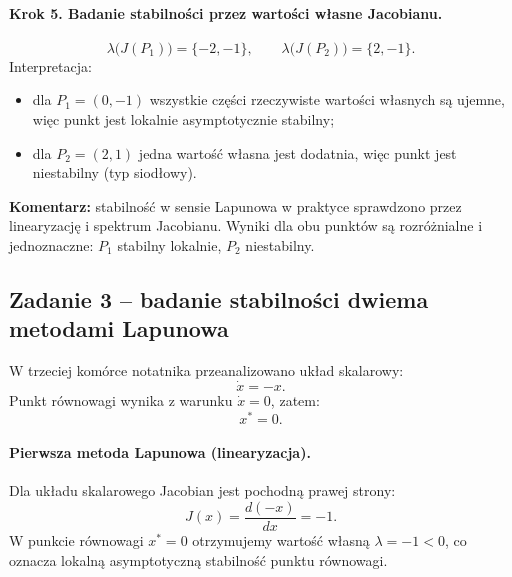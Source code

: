 \documentclass[12pt,a4paper]{article}
\begin{document}
\paragraph{Krok 5. Badanie stabilno\'sci przez warto\'sci w\l{}asne Jacobianu.}
\begin{equation}
    \lambda\big(J(P_1)\big)=\{-2,-1\},\qquad
    \lambda\big(J(P_2)\big)=\{2,-1\}.
\end{equation}
Interpretacja:
\begin{itemize}
    \item dla $P_1=(0,-1)$ wszystkie cz\k{e}\'sci rzeczywiste warto\'sci w\l{}asnych s\k{a} ujemne, wi\k{e}c punkt jest lokalnie asymptotycznie stabilny;
    \item dla $P_2=(2,1)$ jedna warto\'s\'c w\l{}asna jest dodatnia, wi\k{e}c punkt jest niestabilny (typ siod\l{}owy).
\end{itemize}

\textbf{Komentarz:} stabilno\'s\'c w sensie Lapunowa w praktyce sprawdzono przez linearyzacj\k{e} i spektrum Jacobianu. Wyniki dla obu punkt\'ow s\k{a} rozr\'o\.znialne i jednoznaczne: $P_1$ stabilny lokalnie, $P_2$ niestabilny.

\subsection{Zadanie 3 -- badanie stabilno\'sci dwiema metodami Lapunowa}
W trzeciej kom\'orce notatnika przeanalizowano uk\l{}ad skalarowy:
\begin{equation}
    \dot{x}=-x.
\end{equation}
Punkt r\'ownowagi wynika z warunku $\dot{x}=0$, zatem:
\begin{equation}
    x^\ast=0.
\end{equation}

\paragraph{Pierwsza metoda Lapunowa (linearyzacja).}
Dla uk\l{}adu skalarowego Jacobian jest pochodn\k{a} prawej strony:
\begin{equation}
    J(x)=\frac{d(-x)}{dx}=-1.
\end{equation}
W punkcie r\'ownowagi $x^\ast=0$ otrzymujemy warto\'s\'c w\l{}asn\k{a} $\lambda=-1<0$, co oznacza lokaln\k{a} asymptotyczn\k{a} stabilno\'s\'c punktu r\'ownowagi.
\end{document}

